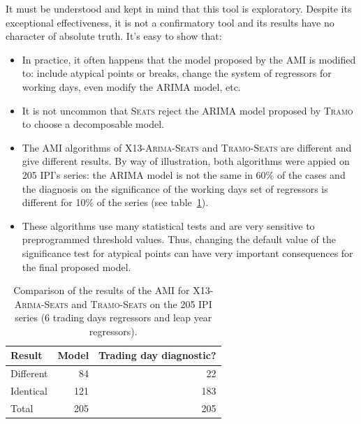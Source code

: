 \documentclass[12pt, a4paper]{article}
\begin{document}
It must be understood and kept in mind that this tool is exploratory. Despite its exceptional effectiveness, it is not a confirmatory tool and its results have no character of absolute truth. It's easy to show that: 
\begin{itemize}
	\item In practice, it often happens that the model proposed by the AMI is modified to: include atypical points or breaks, change the system of regressors for working days, even modify the ARIMA model, etc.
	\item It is not uncommon that \textsc{Seats} reject the ARIMA model proposed by \textsc{Tramo} to choose a decomposable model.
	\item The AMI algorithms of \textsc{X13-Arima-Seats} and \textsc{Tramo-Seats} are different and give different results. By way of illustration, both algorithms were appied on 205 IPI's series: the ARIMA model is not the same in 60\% of the cases and the diagnosis on the significance of the working days set of regressors is different for 10\% of the series (see table~\ref{table:CompareTSX13}).
	\item These algorithms use many statistical tests and are very sensitive to preprogrammed threshold values. Thus, changing the default value of the significance test for atypical points can have very important consequences for the final proposed model.
\end{itemize}

\begin{table}
\caption[Comparison of the results of the AMI for X13-Arima-Seats and Tramo-Seats on the 205 IPI series (6 trading days regressors and leap year regressors)]{Comparison of the results of the AMI for \textsc{X13-Arima-Seats} and \textsc{Tramo-Seats} on the 205 IPI series (6 trading days regressors and leap year regressors).}\label{table:CompareTSX13}
\begin{center}
\small
\begin{tabular}{lrr} \\
\hline
\rule{0pt}{3ex}Result&Model& Trading day diagnostic?  \\
\hline
Different&  84&  22 \\
Identical& 121& 183 \\
\hline
Total& 205 & 205  \\
\hline
\end{tabular}
\normalsize
\end{center}
\end{table}
\end{document}
